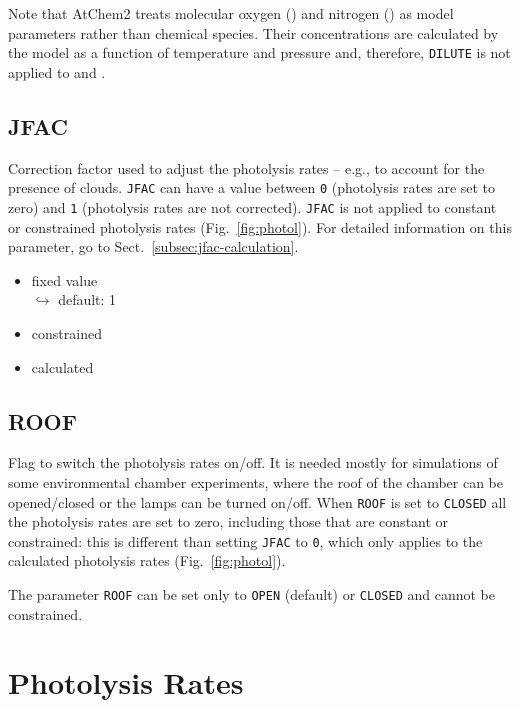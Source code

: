 Note that AtChem2 treats molecular oxygen () and nitrogen
() as model parameters rather than chemical species. Their
concentrations are calculated by the model as a function of
temperature and pressure and, therefore, \texttt{DILUTE} is not
applied to  and .

\subsection{JFAC} \label{subsec:jfac}

Correction factor used to adjust the photolysis rates -- e.g., to
account for the presence of clouds. \texttt{JFAC} can have a value
between \texttt{0} (photolysis rates are set to zero) and \texttt{1}
(photolysis rates are not corrected). \texttt{JFAC} is not applied to
constant or constrained photolysis rates (Fig.~\ref{fig:photol}). For
detailed information on this parameter, go to
Sect.~\ref{subsec:jfac-calculation}.

\begin{itemize}
\item fixed value\\$\hookrightarrow$ default: 1
\item constrained
\item calculated
\end{itemize}

\subsection{ROOF} \label{subsec:roof}

Flag to switch the photolysis rates on/off. It is needed mostly for
simulations of some environmental chamber experiments, where the roof
of the chamber can be opened/closed or the lamps can be turned on/off.
When \texttt{ROOF} is set to \texttt{CLOSED} all the photolysis rates
are set to zero, including those that are constant or constrained:
this is different than setting \texttt{JFAC} to \texttt{0}, which only
applies to the calculated photolysis rates (Fig.~\ref{fig:photol}).

The parameter \texttt{ROOF} can be set only to \texttt{OPEN} (default)
or \texttt{CLOSED} and cannot be constrained.

\section{Photolysis Rates} \label{sec:photolysis-rates}

